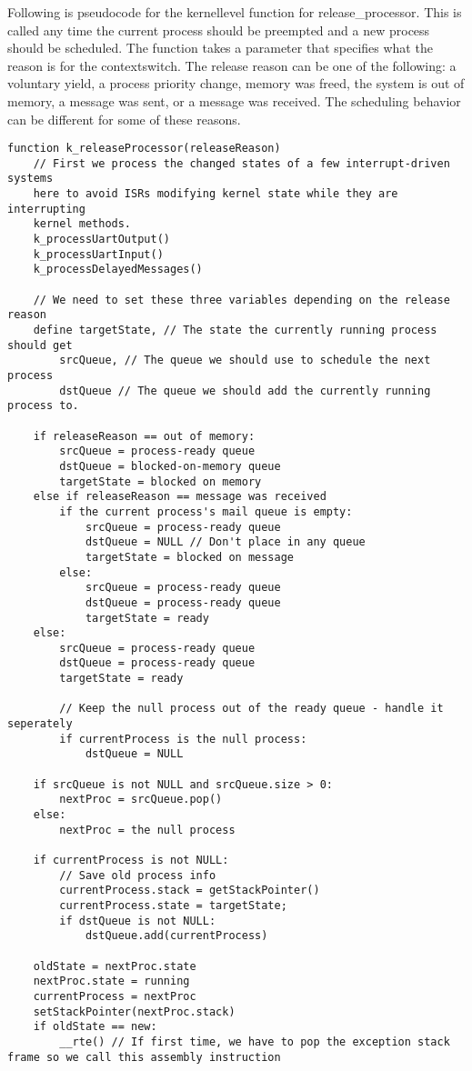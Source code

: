 \documentclass[12pt]{report}
\begin{document}
Following is pseudo\-code for the kernel\-level function for release\_processor.
This is called any time the current process should be preempted and a new
process should be scheduled. The function takes a parameter that specifies what
the reason is for the context\-switch. The release reason can be one of the
following: a voluntary yield, a process priority change, memory was freed, the
system is out of memory, a message was sent, or a message was received. The
scheduling behavior can be different for some of these reasons.

\begin{lstlisting}
function k_releaseProcessor(releaseReason)
    // First we process the changed states of a few interrupt-driven systems
    here to avoid ISRs modifying kernel state while they are interrupting
    kernel methods.
    k_processUartOutput()
    k_processUartInput()
    k_processDelayedMessages()

    // We need to set these three variables depending on the release reason
    define targetState, // The state the currently running process should get
        srcQueue, // The queue we should use to schedule the next process
        dstQueue // The queue we should add the currently running process to.

    if releaseReason == out of memory:
        srcQueue = process-ready queue
        dstQueue = blocked-on-memory queue
        targetState = blocked on memory
    else if releaseReason == message was received
        if the current process's mail queue is empty:
            srcQueue = process-ready queue
            dstQueue = NULL // Don't place in any queue
            targetState = blocked on message
        else:
            srcQueue = process-ready queue
            dstQueue = process-ready queue
            targetState = ready
    else:
        srcQueue = process-ready queue
        dstQueue = process-ready queue
        targetState = ready

        // Keep the null process out of the ready queue - handle it seperately
        if currentProcess is the null process:
            dstQueue = NULL

    if srcQueue is not NULL and srcQueue.size > 0:
        nextProc = srcQueue.pop()
    else:
        nextProc = the null process

    if currentProcess is not NULL:
        // Save old process info
        currentProcess.stack = getStackPointer()
        currentProcess.state = targetState;
        if dstQueue is not NULL:
            dstQueue.add(currentProcess)

    oldState = nextProc.state
    nextProc.state = running
    currentProcess = nextProc
    setStackPointer(nextProc.stack)
    if oldState == new:
        __rte() // If first time, we have to pop the exception stack frame so we call this assembly instruction
\end{lstlisting}
\end{document}
